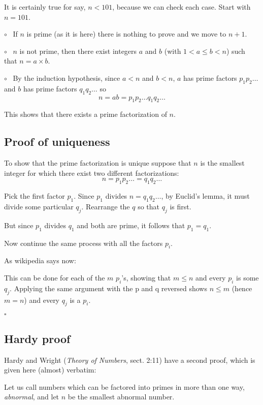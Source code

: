 \documentclass[11pt, oneside]{article}
\begin{document}
It is certainly true for say, $n < 101$, because we can check each case.  Start with $n = 101$.

$\circ$ \ If $n$ is prime (as it is here) there is nothing to prove and we move to $n + 1$.  

$\circ$ \  $n$ is not prime, then there exist integers $a$ and $b$ (with $1 < a \le b < n$) such that $n = a \times b$.

$\circ$ \ By the induction hypothesis, since $a < n$ and $b < n$, $a$ has prime factors $p_1 p_2 \dots$ and $b$ has prime factors $q_1 q_2 \dots$ so
\[ n = ab = p_1 p_2 \dots q_1 q_2 \dots \]

This shows that there exists a prime factorization of $n$.

\subsection*{Proof of uniqueness}

To show that the prime factorization is unique suppose that $n$ is the smallest integer for which there exist two different factorizations:
\[ n = p_1 p_2 \dots = q_1 q_2 \dots \]
    
Pick the first factor $p_1$.  Since $p_1$ divides $n = q_1 q_2 \dots$, by Euclid's lemma, it must divide some particular $q_j$.  Rearrange the $q$ so that $q_j$ is first.

But since $p_1$ divides $q_1$ and both are prime, it follows that $p_1 = q_1$. 

Now continue the same process with all the factors $p_i$.

As wikipedia says now:

    This can be done for each of the $m$ $p_i$'s, showing that $m \le n$ and every $p_i$ is some $q_j$. Applying the same argument with the p and q reversed shows $n \le m$ (hence $m = n$) and every $q_j$ is a $p_i$.
    
$\square$
    
\subsection*{Hardy proof}

Hardy and Wright (\emph{Theory of Numbers}, sect. 2:11) have a second proof, which is given here (almost) verbatim:

    Let us call numbers which can be factored into primes in more than one way, \emph{abnormal}, and let $n$ be the smallest abnormal number.
\end{document}
